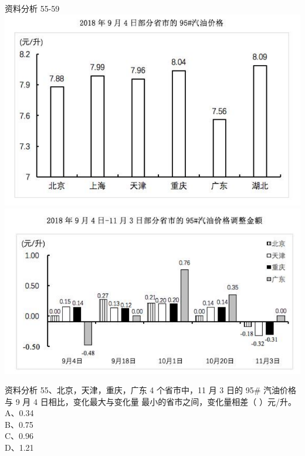 \documentclass[aspectratio=169]{beamer}
\begin{document}
\begin{frame}[t]{资料分析}
    55-59\\
    \includegraphics[scale=0.29]{55259-1}
    \includegraphics[scale=0.29]{55259-2}
\end{frame}                           


\begin{frame}[t]{资料分析}
    55、北京，天津，重庆，广东 4 个省市中，11 月 3 日的 95\# 汽油价格与 9 月 4 日相比，变化最大与变化量
    最小的省市之间，变化量相差（ ）元/升。\\
    A、0.34                               \\
    B、0.75                               \\
    C、0.96                               \\
    D、1.21                               \\
\end{frame}                           
\end{document}
